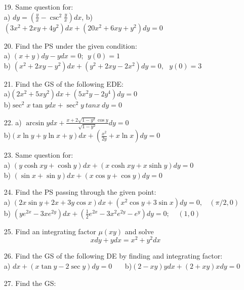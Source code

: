 \documentclass[11pt]{amsbook}
\begin{document}
	
	\begin{enumerate}
        \item[19.] Same question for:\\
        a) $dy = (\frac{y}{x} - \csc ^2 \frac{y}{x})dx$,   b)$(3x^2 + 2xy + 4y^2)dx + (20x^2 + 6xy + y^2) dy = 0$ 
        \item[20.] Find the PS under the given condition:\\
        a) $(x+y) dy - ydx = 0;\ \  y(0) = 1$\\
        b) $(x^2 + 2xy - y^2) dx + (y^2 + 2xy - 2x^2)dy = 0,\ \ \ y(0) = 3$
        \item[21.] Find the GS of the following EDE:\\
        a)$(2x^2 + 5xy^2)dx + (5x^2y - 2y^4)dy = 0$\\
        b)$\sec^2x \tan y dx  + \sec^2y \ tanx\  dy = 0$
        \item[22.] a) $\arcsin y dx + \frac{x + 2\sqrt{1-y^2} \cos y}{\sqrt{1-y^2}} dy = 0$\\
        b)$(x \ln y + y \ln x + y)dx + ( \frac{x^2}{2y} + x \ln x)dy = 0$
        \item[23.] Same question for:\\
        a) $(y \cosh xy + \cosh y)dx + (x \cosh xy + x \sinh y)dy = 0$\\
        b) $(\sin x + \sin y)dx + (x \cos y + \cos y)dy = 0$
        \item[24.] Find the PS passing through the given point:\\
        a) $(2x \sin y + 2x + 3y \cos x)dx + (x^2 \cos y + 3 \sin x)dy = 0, \ \ \ \ (\pi /2, 0)$\\
        b) $(y e ^{2x} - 3x e^{2y}) dx + (\frac{1}{2} e ^{2x} - 3x^2 e^{2y} - e^y)dy = 0; \ \ \ \ \  (1,0)$ 
        \item[25.] Find an integrating factor $\mu (xy)$ and solve
        $$ x dy + y dx = x^2 + y^2 dx $$
        \item[26.]  Find the GS of the following DE by finding and integrating factor:\\
        a) $ dx + ( x  \tan y -2 \sec y) dy = 0$ \ \ \ b)$(2-xy)y dx + (2 + xy) xdy =0$
        \item[27.] Find the GS:
    \end{enumerate}
\end{document}
